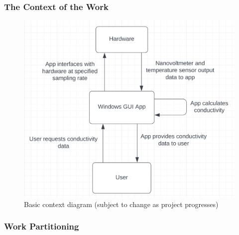 \documentclass[12pt, titlepage]{article}
\begin{document}
\subsubsection{The Context of the Work}
\begin{figure}[H]
\centerline{\includegraphics[scale=0.8]{ContextDiagram.PNG}}
\caption{Basic context diagram (subject to change as project progresses)}
\label{fig}
\end{figure}

\subsubsection{Work Partitioning}
\end{document}

